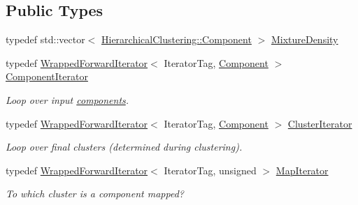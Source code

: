 \subsection*{Public Types}
\begin{DoxyCompactItemize}
\item 
typedef std::vector$<$ \hyperlink{classeos_1_1HierarchicalClustering_1_1Component}{HierarchicalClustering::Component} $>$ \hyperlink{classeos_1_1HierarchicalClustering_aa51668b14931e2a8b1697c8f26a8f1c8}{MixtureDensity}
\item 
typedef \hyperlink{classeos_1_1WrappedForwardIterator}{WrappedForwardIterator}$<$ IteratorTag, \hyperlink{classeos_1_1HierarchicalClustering_1_1Component}{Component} $>$ \hyperlink{classeos_1_1HierarchicalClustering_a4d4c7214856d750b968299925f29b207}{ComponentIterator}
\begin{DoxyCompactList}\small\item\em Loop over input \hyperlink{namespaceeos_1_1components}{components}. \item\end{DoxyCompactList}\item 
typedef \hyperlink{classeos_1_1WrappedForwardIterator}{WrappedForwardIterator}$<$ IteratorTag, \hyperlink{classeos_1_1HierarchicalClustering_1_1Component}{Component} $>$ \hyperlink{classeos_1_1HierarchicalClustering_aae7753bcc3666ca15b333a39aa454b29}{ClusterIterator}
\begin{DoxyCompactList}\small\item\em Loop over final clusters (determined during clustering). \item\end{DoxyCompactList}\item 
typedef \hyperlink{classeos_1_1WrappedForwardIterator}{WrappedForwardIterator}$<$ IteratorTag, unsigned $>$ \hyperlink{classeos_1_1HierarchicalClustering_a7cf007a3d8e09d9b37f0c28c82013441}{MapIterator}
\begin{DoxyCompactList}\small\item\em To which cluster is a component mapped? \item\end{DoxyCompactList}\end{DoxyCompactItemize}
